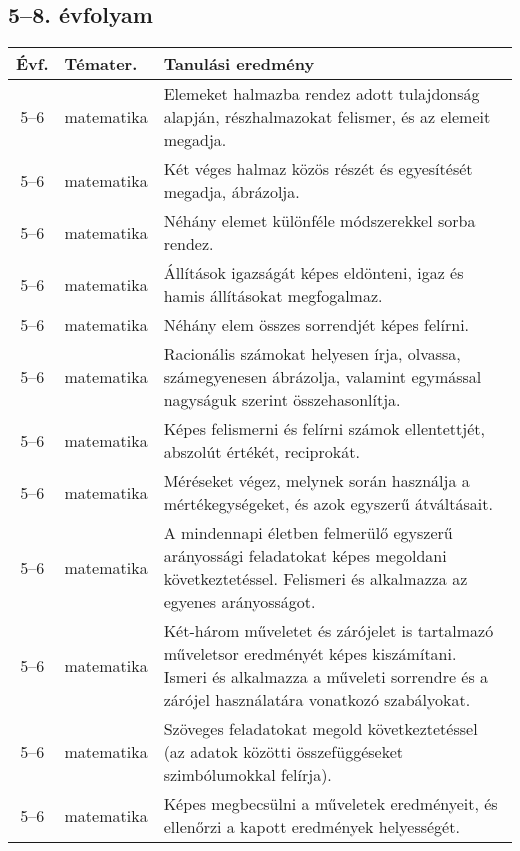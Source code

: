 \subsection{5--8. évfolyam}
\begin{small}
  \begin{longtable}{c | p{2cm} |  p{11cm} }
    \textbf{Évf.} & \textbf{Témater.} & \textbf{Tanulási eredmény} \\ \hline \hline
    \endhead

              5--6 & matematika & Elemeket halmazba rendez adott tulajdonság alapján, részhalmazokat felismer, és az elemeit megadja. \\ \hline
              5--6 & matematika & Két véges halmaz közös részét és egyesítését megadja, ábrázolja. \\ \hline
              5--6 & matematika & Néhány elemet különféle módszerekkel sorba rendez. \\ \hline
              5--6 & matematika & Állítások igazságát képes eldönteni, igaz és hamis állításokat megfogalmaz. \\ \hline
              5--6 & matematika & Néhány elem összes sorrendjét képes felírni. \\ \hline
              5--6 & matematika & Racionális számokat helyesen írja, olvassa, számegyenesen ábrázolja, valamint  egymással nagyságuk szerint összehasonlítja. \\ \hline
              5--6 & matematika & Képes felismerni és felírni számok ellentettjét, abszolút értékét, reciprokát. \\ \hline
              5--6 & matematika & Méréseket végez, melynek során használja a mértékegységeket, és azok egyszerű átváltásait. \\ \hline
              5--6 & matematika & A mindennapi életben felmerülő egyszerű arányossági feladatokat képes megoldani következtetéssel. Felismeri és alkalmazza az egyenes arányosságot. \\ \hline
              5--6 & matematika & Két-három műveletet és zárójelet is tartalmazó műveletsor eredményét képes kiszámítani. Ismeri és alkalmazza a műveleti sorrendre és a zárójel használatára vonatkozó szabályokat. \\ \hline
              5--6 & matematika & Szöveges feladatokat megold következtetéssel (az adatok közötti összefüggéseket szimbólumokkal felírja). \\ \hline
              5--6 & matematika & Képes megbecsülni a műveletek eredményeit, és ellenőrzi a kapott eredmények helyességét. \\ \hline

\end{longtable}
\end{small}
